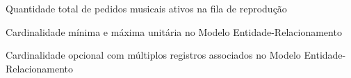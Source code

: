 \begin{simbolos}
  \item[$N$] Quantidade total de pedidos musicais ativos na fila de reprodução
  \item[$(1,1)$] Cardinalidade mínima e máxima unitária no Modelo Entidade-Relacionamento
  \item[$(0,n)$] Cardinalidade opcional com múltiplos registros associados no Modelo Entidade-Relacionamento
\end{simbolos}
